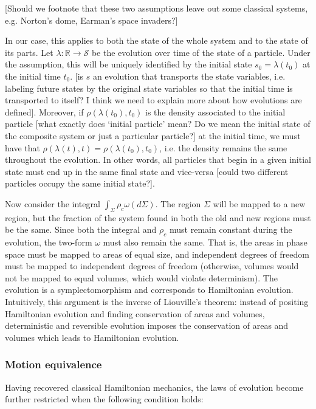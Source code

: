 \documentclass[letterpaper]{article}
\begin{document}
[Should we footnote that these two assumptions leave out some classical systems, e.g. Norton's dome, Earman's space invaders?]

In our case, this applies to both the state of the whole system and to the state of its parts. Let $\lambda : \mathbb{R} \to \mathcal{S}$ be the evolution over time of the state of a particle. Under the assumption, this will be uniquely identified by the initial state $s_0 = \lambda(t_0)$ at the initial time $t_0$. [is $s$ an evolution that transports the state variables, i.e. labeling future states by the original state variables so that the initial time is transported to itself? I think we need to explain more about how evolutions are defined]. Moreover, if $\rho(\lambda(t_0), t_0)$ is the density associated to the initial particle [what exactly does `initial particle' mean? Do we mean the initial state of the composite system or just a particular particle?] at the initial time, we must have that $\rho(\lambda(t), t) = \rho(\lambda(t_0), t_0)$, i.e. the density remains the same throughout the evolution. In other words, all particles that begin in a given initial state must end up in the same final state and vice-versa [could two different particles occupy the same initial state?].

Now consider the integral $\int_{\Sigma} \rho_c \omega(d\Sigma)$. The region $\Sigma$ will be mapped to a new region, but the fraction of the system found in both the old and new regions must be the same. Since both the integral and $\rho_c$ must remain constant during the evolution, the two-form $\omega$ must also remain the same. That is, the areas in phase space must be mapped to areas of equal size, and independent degrees of freedom must be mapped to independent degrees of freedom (otherwise, volumes would not be mapped to equal volumes, which would violate determinism). The evolution is a symplectomorphism and corresponds to Hamiltonian evolution. Intuitively, this argument is the inverse of Liouville's theorem: instead of positing Hamiltonian evolution and finding conservation of areas and volumes, deterministic and reversible evolution imposes the conservation of areas and volumes which leads to Hamiltonian evolution.


\subsubsection{Motion equivalence}

Having recovered classical Hamiltonian mechanics, the laws of evolution become further restricted when the following condition holds:
\end{document}
